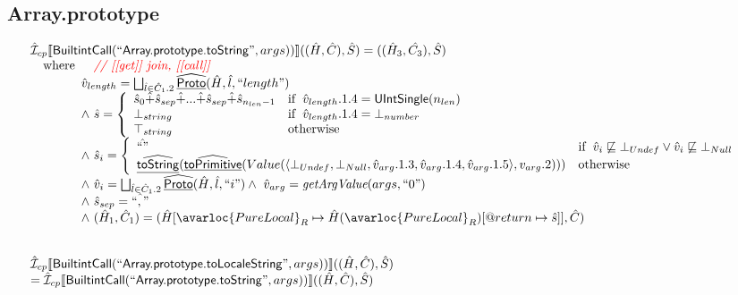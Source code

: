 \subsection{Array.prototype}
\[
\begin{array}{l}
\aI _{cp}\lbr \SF{BuiltintCall}(``\SF{Array.prototype.toString}",args))\rbr((\hat{H},\hat{C}), \hat{S})
  = ((\hat{H}_3, \hat{C_3}), \hat{S})\\
\quad\wherec{
  \quad\comment{{\inred // [[get]] join, [[call]] }}\\
  \hat{v}_{length} = \bigsqcup_{\hat{l} \in \hat{C}_1.2}  \ahf{Proto}(\hat{H}, \hat{l}, ``length")\\
  \land\ \hat{s} = \left\{\begin{array}{ll}
      \hat{s}_0 \hat{+} \hat{s}_{sep} \hat{+} ... \hat{+} \hat{s}_{sep} \hat{+} \hat{s}_{n_{len} -1}& \ifc{\hat{v}_{length}.1.4 = \SF{UIntSingle}(n_{len})}\\
      \bot_{string} & \ifc{\hat{v}_{length}.1.4 = \bot_{number}}\\
      \top_{string} & \owc
    \end{array}\right.\\
  \land\ \hat{s}_i = \left\{\begin{array}{ll}
      \hat{``"} & \ifc{\hat{v}_i \not\sqsubseteq \bot_{Undef} \lor \hat{v}_i \not\sqsubseteq \bot_{Null}}\\
      \ahf{toString}(\ahf{toPrimitive}(Value(\langle\bot_{Undef}, \bot_{Null}, \hat{v}_{arg}.1.3, \hat{v}_{arg}.1.4, \hat{v}_{arg}.1.5\rangle, v_{arg}.2))) & \owc
    \end{array}\right.\\
  \land\ \hat{v}_i =  \bigsqcup_{\hat{l} \in \hat{C}_1.2}  \ahf{Proto}(\hat{H}, \hat{l}, ``i")
  \land\ \hat{v}_{arg} = \hf{getArgValue}(args, ``0")\\
  \land\ \hat{s}_{sep} = \hat{``,"} \\
  \land\ (\hat{H}_1, \hat{C}_1) = 
      (\hat{H}[\avarloc{PureLocal}_R \mapsto \hat{H}(\avarloc{PureLocal}_R)[\varprop{return} \mapsto \hat{s}]], \hat{C})\\
  }\\
\\\\


\aI _{cp}\lbr \SF{BuiltintCall}(``\SF{Array.prototype.toLocaleString}",args))\rbr((\hat{H},\hat{C}), \hat{S})
\\= \aI _{cp}\lbr \SF{BuiltintCall}(``\SF{Array.prototype.toString}",args))\rbr((\hat{H},\hat{C}), \hat{S})
\\\\


\end{array}\]
